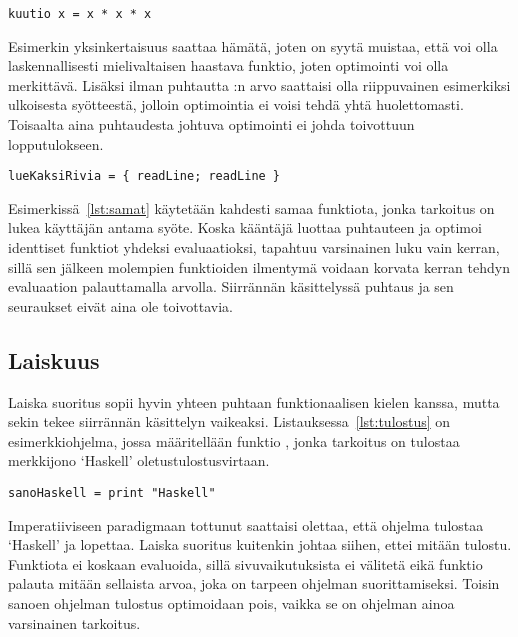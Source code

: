 \documentclass[finnish]{tktltiki2}
\begin{document}
\begin{lstlisting}[float,label={lst:kuutio},caption={Puhdasta laskentaa}]
kuutio x = x * x * x
\end{lstlisting}

Esimerkin yksinkertaisuus saattaa hämätä, joten on syytä muistaa, että  voi olla
laskennallisesti mielivaltaisen haastava funktio, joten optimointi voi olla merkittävä. Lisäksi
ilman puhtautta :n arvo saattaisi olla riippuvainen esimerkiksi ulkoisesta syötteestä,
jolloin optimointia ei voisi tehdä yhtä huolettomasti. Toisaalta aina puhtaudesta johtuva
optimointi ei johda toivottuun lopputulokseen.

\begin{lstlisting}[float,label={lst:samat},caption={Kaksi samaa funktiota}]
lueKaksiRivia = { readLine; readLine }
\end{lstlisting}

Esimerkissä~\ref{lst:samat} käytetään kahdesti samaa funktiota, jonka tarkoitus on lukea käyttäjän
antama syöte. Koska kääntäjä luottaa puhtauteen ja optimoi identtiset funktiot yhdeksi
evaluaatioksi, tapahtuu varsinainen luku vain kerran, sillä sen jälkeen molempien funktioiden
ilmentymä voidaan korvata kerran tehdyn evaluaation palauttamalla arvolla. Siirrännän käsittelyssä
puhtaus ja sen seuraukset eivät aina ole toivottavia.

\subsection{Laiskuus}

Laiska suoritus sopii hyvin yhteen puhtaan funktionaalisen kielen kanssa, mutta sekin tekee
siirrännän käsittelyn vaikeaksi. Listauksessa~\ref{lst:tulostus} on esimerkkiohjelma, jossa
määritellään funktio , jonka tarkoitus on tulostaa merkkijono `Haskell'
oletustulostusvirtaan.

\begin{lstlisting}[float,label={lst:tulostus},caption={Tulostava esimerkkiohjelma}]
sanoHaskell = print "Haskell"
\end{lstlisting}

Imperatiiviseen paradigmaan tottunut saattaisi olettaa, että ohjelma tulostaa `Haskell' ja lopettaa.
Laiska suoritus kuitenkin johtaa siihen, ettei mitään tulostu. Funktiota  ei koskaan
evaluoida, sillä sivuvaikutuksista ei välitetä eikä funktio palauta mitään sellaista arvoa, joka on
tarpeen ohjelman suorittamiseksi. Toisin sanoen ohjelman tulostus optimoidaan pois, vaikka se on
ohjelman ainoa varsinainen tarkoitus.
\end{document}
